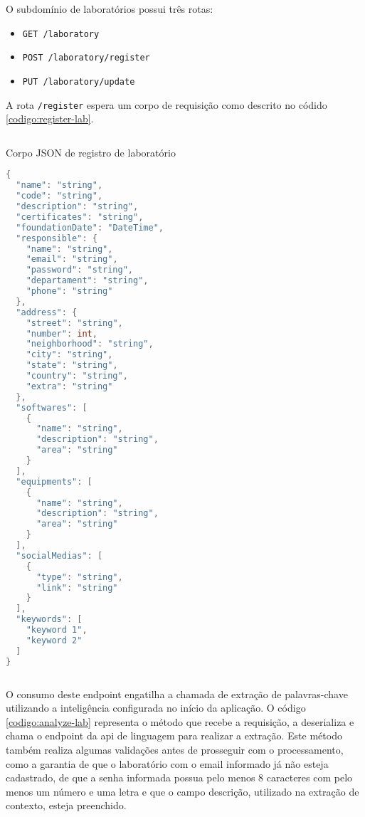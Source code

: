 O subdomínio de laboratórios possui três rotas:

\begin{itemize}
  \item \texttt{GET /laboratory}
  \item \texttt{POST /laboratory/register}
  \item \texttt{PUT /laboratory/update}
\end{itemize}

A rota \texttt{/register} espera um corpo de requisição como descrito no códido \ref{codigo:register-lab}.

\begin{sourcecode}[H]
  \caption{\label{codigo:register-lab}Corpo JSON de registro de laboratório}
  \begin{lstlisting}[frame=single, language=Java]
{
  "name": "string",
  "code": "string",
  "description": "string",
  "certificates": "string",
  "foundationDate": "DateTime",
  "responsible": {
    "name": "string",
    "email": "string",
    "password": "string",
    "departament": "string",
    "phone": "string"
  },
  "address": {
    "street": "string",
    "number": int,
    "neighborhood": "string",
    "city": "string",
    "state": "string",
    "country": "string",
    "extra": "string"
  },
  "softwares": [
    {
      "name": "string",
      "description": "string",
      "area": "string"
    }
  ],
  "equipments": [
    {
      "name": "string",
      "description": "string",
      "area": "string"
    }
  ],
  "socialMedias": [
    {
      "type": "string",
      "link": "string"
    }
  ],
  "keywords": [
    "keyword 1",
    "keyword 2"
  ]
}
\end{lstlisting}
  \fonte{}
\end{sourcecode}

O consumo deste endpoint engatilha a chamada de extração de palavras-chave utilizando a inteligência configurada no início da aplicação. O código \ref{codigo:analyze-lab} representa o método que recebe a requisição, a deserializa e chama o endpoint da \gls{api} de linguagem para realizar a extração. Este método também realiza algumas validações antes de prosseguir com o processamento, como a garantia de que o laboratório com o email informado já não esteja cadastrado, de que a senha informada possua pelo menos 8 caracteres com pelo menos um número e uma letra e que o campo descrição, utilizado na extração de contexto, esteja preenchido.

